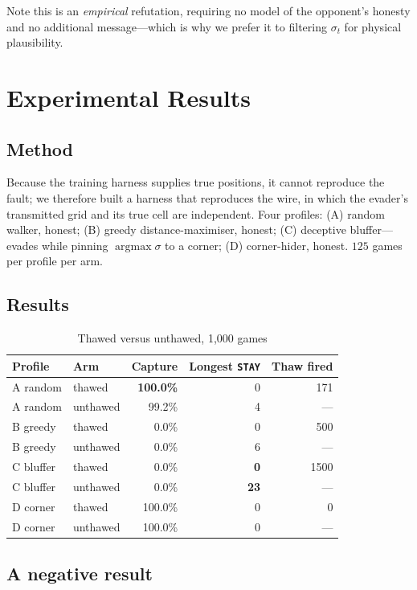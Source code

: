 \documentclass[conference]{IEEEtran}
\begin{document}
Note this is an \emph{empirical} refutation, requiring no model of the
opponent's honesty and no additional message---which is why we prefer it to
filtering $\sigma_t$ for physical plausibility.

\section{Experimental Results}

\subsection{Method}
Because the training harness supplies true positions, it cannot reproduce the
fault; we therefore built a harness that reproduces the wire, in which the
evader's transmitted grid and its true cell are independent. Four profiles:
(A) random walker, honest; (B) greedy distance-maximiser, honest;
(C) deceptive bluffer---evades while pinning $\operatorname{argmax}\sigma$ to a
corner; (D) corner-hider, honest. $125$ games per profile per arm.

\subsection{Results}

\begin{table}[h]
\caption{Thawed versus unthawed, 1{,}000 games}
\label{tab:bench}
\centering
\begin{tabular}{llrrr}
\toprule
Profile & Arm & Capture & Longest \texttt{STAY} & Thaw fired \\
\midrule
A random  & thawed   & \textbf{100.0\%} & 0 & 171 \\
A random  & unthawed & 99.2\% & 4 & --- \\
B greedy  & thawed   & 0.0\% & 0 & 500 \\
B greedy  & unthawed & 0.0\% & 6 & --- \\
C bluffer & thawed   & 0.0\% & \textbf{0} & 1500 \\
C bluffer & unthawed & 0.0\% & \textbf{23} & --- \\
D corner  & thawed   & 100.0\% & 0 & 0 \\
D corner  & unthawed & 100.0\% & 0 & --- \\
\bottomrule
\end{tabular}
\end{table}

\subsection{A negative result}
\end{document}
